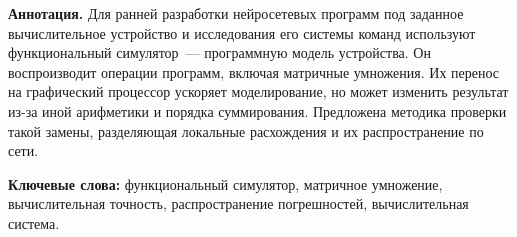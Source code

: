 \begin{center}
    \begin{minipage}{0.92\textwidth}
        \small
        \textbf{Аннотация.}
        Для ранней разработки нейросетевых программ под заданное
        вычислительное устройство и исследования его системы команд
        используют функциональный симулятор~--- программную модель
        устройства. Он воспроизводит операции программ, включая матричные
        умножения. Их перенос на графический процессор ускоряет моделирование,
        но может изменить результат из-за иной арифметики и порядка
        суммирования. Предложена методика проверки такой замены, разделяющая
        локальные расхождения и их распространение по сети.

        \smallskip
        \textbf{Ключевые слова:} функциональный симулятор,
        матричное умножение, вычислительная точность,
        распространение погрешностей, вычислительная система.
    \end{minipage}
\end{center}

\vspace{0.5em}
